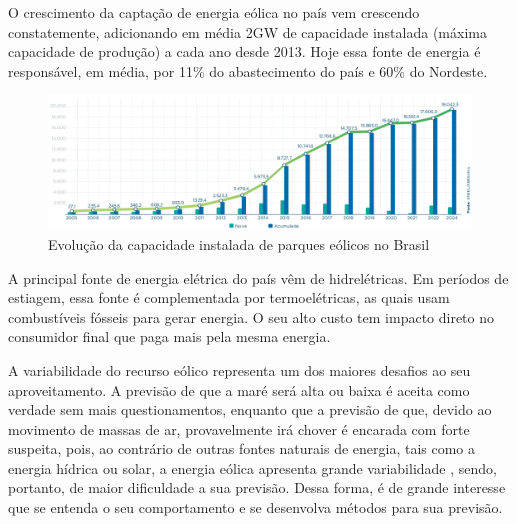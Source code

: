 \documentclass[
	12pt,				%
	openright,			%
	oneside,			%
	a4paper,			%
	english,			%
	french,				%
	spanish,			%
	brazil				%
	]{abntex2}
\begin{document}
O crescimento da captação de energia eólica no país vem crescendo constatemente, adicionando em média 2GW de capacidade instalada (máxima capacidade de produção) a cada ano desde 2013. Hoje essa fonte de energia é responsável, em média, por 11\% do abastecimento do país e 60\% do Nordeste.

\begin{figure}[h]
    \centering
	\includegraphics[width=\textwidth]{abe_evolucao_capacidade_instalada}
	\caption{Evolução da capacidade instalada de parques eólicos no Brasil}
\end{figure}
\FloatBarrier

A principal fonte de energia elétrica do país vêm de hidrelétricas. Em períodos de estiagem, essa fonte é complementada por termoelétricas, as quais usam combustíveis fósseis para gerar energia. O seu alto custo tem impacto direto no consumidor final que paga mais pela mesma energia. 

A variabilidade do recurso eólico representa um dos maiores desafios ao seu aproveitamento. A previsão de que a maré será alta ou baixa é aceita como verdade sem mais questionamentos, enquanto que a previsão de que, devido ao movimento de massas de ar, provavelmente irá chover é encarada com forte suspeita, pois, ao contrário de outras fontes naturais de energia, tais como a energia hídrica ou solar, a energia eólica apresenta grande variabilidade \cite{thomas}, sendo, portanto, de maior dificuldade a sua previsão. Dessa forma, é de grande interesse que se entenda o seu comportamento e se desenvolva métodos para sua previsão.


\end{document}
